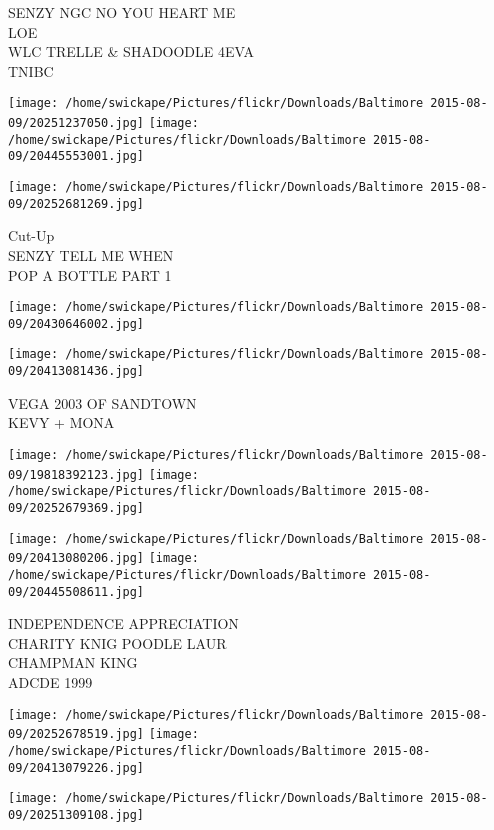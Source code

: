 \documentclass[10pt,letterpaper]{article}
\begin{document}
SENZY NGC NO YOU HEART ME\\
LOE\\
WLC TRELLE \& SHADOODLE 4EVA\\
TNIBC\\
\pagebreak

\texttt{[image: /home/swickape/Pictures/flickr/Downloads/Baltimore 2015-08-09/20251237050.jpg]}
\texttt{[image: /home/swickape/Pictures/flickr/Downloads/Baltimore 2015-08-09/20445553001.jpg]}

\texttt{[image: /home/swickape/Pictures/flickr/Downloads/Baltimore 2015-08-09/20252681269.jpg]}

Cut{-}Up\\
SENZY TELL ME WHEN\\
POP A BOTTLE PART 1\\
\pagebreak

\texttt{[image: /home/swickape/Pictures/flickr/Downloads/Baltimore 2015-08-09/20430646002.jpg]}

\vspace{0.25in}
\texttt{[image: /home/swickape/Pictures/flickr/Downloads/Baltimore 2015-08-09/20413081436.jpg]}

VEGA 2003 OF SANDTOWN\\
KEVY + MONA\\
\pagebreak

\texttt{[image: /home/swickape/Pictures/flickr/Downloads/Baltimore 2015-08-09/19818392123.jpg]}
\texttt{[image: /home/swickape/Pictures/flickr/Downloads/Baltimore 2015-08-09/20252679369.jpg]}

\texttt{[image: /home/swickape/Pictures/flickr/Downloads/Baltimore 2015-08-09/20413080206.jpg]}
\texttt{[image: /home/swickape/Pictures/flickr/Downloads/Baltimore 2015-08-09/20445508611.jpg]}

INDEPENDENCE APPRECIATION\\
CHARITY KNIG POODLE LAUR\\
CHAMPMAN KING\\
ADCDE 1999\\
\pagebreak

\texttt{[image: /home/swickape/Pictures/flickr/Downloads/Baltimore 2015-08-09/20252678519.jpg]}
\texttt{[image: /home/swickape/Pictures/flickr/Downloads/Baltimore 2015-08-09/20413079226.jpg]}

\vspace{0.25in}
\texttt{[image: /home/swickape/Pictures/flickr/Downloads/Baltimore 2015-08-09/20251309108.jpg]}
\end{document}
